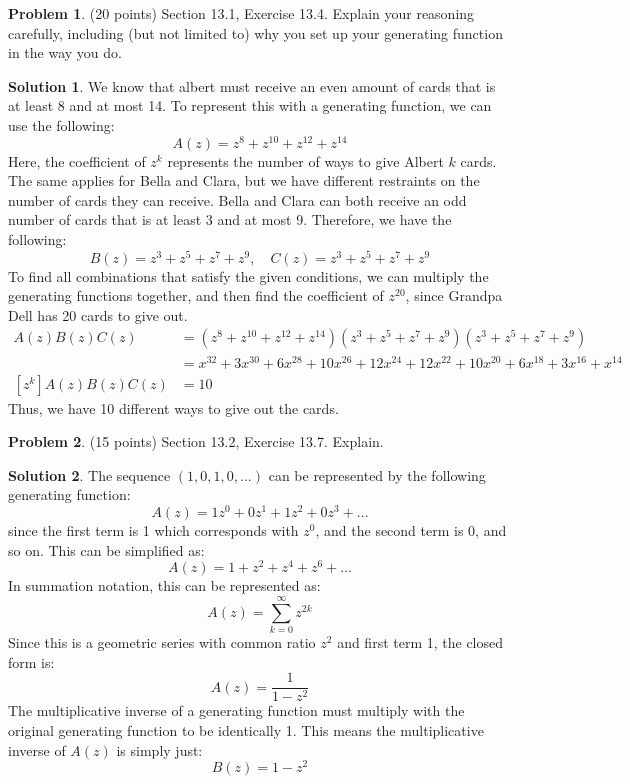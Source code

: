 \documentclass{article}
\theoremstyle{definition}
\newtheorem{problem}{Problem}
\newtheorem*{solution}{Solution}
\begin{document}
\newpage
\begin{problem} (20 points) Section 13.1, Exercise 13.4. Explain your reasoning 
carefully, including (but not limited to) why you set up your generating function 
in the way you do.
\end{problem}
\begin{solution}
We know that albert must receive an even amount of cards that is at least 8 and at most 14.
To represent this with a generating function, we can use the following:
$$ A(z) = z^8 + z^{10} + z^{12} + z^{14} $$
Here, the coefficient of $z^k$ represents the number of ways to give Albert $k$ cards.
The same applies for Bella and Clara, but we have different restraints on the number of cards they can receive.
Bella and Clara can both receive an odd number of cards that is at least 3 and at most 9.
Therefore, we have the following:
$$ B(z) = z^3 + z^5 + z^7 + z^9, \quad C(z) = z^3 + z^5 + z^7 + z^9 $$
To find all combinations that satisfy the given conditions, we can multiply the generating functions together,
and then find the coefficient of $z^{20}$, since Grandpa Dell has 20 cards to give out.
\begin{align*}
A(z)B(z)C(z) &= (z^8 + z^{10} + z^{12} + z^{14})(z^3 + z^5 + z^7 + z^9)(z^3 + z^5 + z^7 + z^9) \\
             &= x^{32} + 3x^{30} + 6x^{28} + 10x^{26} + 12x^{24} + 12x^{22} + 10x^{20} + 6x^{18} + 3x^{16} + x^{14} \\
[z^k]A(z)B(z)C(z) &= 10
\end{align*}
Thus, we have 10 different ways to give out the cards.
\end{solution}

\newpage
\begin{problem} (15 points) Section 13.2, Exercise 13.7. Explain.
\end{problem}
\begin{solution}
The sequence $(1, 0, 1, 0, ...)$ can be represented by the following generating function:
$$ A(z) = 1z^0 + 0z^1 + 1z^2 + 0z^3 + ... $$
since the first term is 1 which corresponds with $z^0$, and the second term is 0, and so on.
This can be simplified as:
$$ A(z) = 1 + z^2 + z^4 + z^6 + ... $$
In summation notation, this can be represented as:
$$ A(z) = \sum_{k=0}^{\infty} z^{2k} $$
Since this is a geometric series with common ratio $z^2$ and first term 1, the closed form is:
$$ A(z) = \frac{1}{1 - z^2} $$
The multiplicative inverse of a generating function must multiply with the original generating function to be identically 1.
This means the multiplicative inverse of $A(z)$ is simply just:
$$ B(z) = 1 - z^2 $$
\end{solution}
\end{document}
